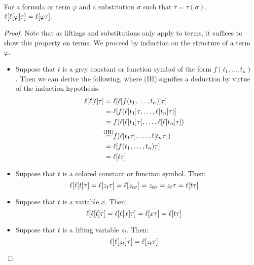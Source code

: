 %
%
\begin{lemma}
	\label{lemma:lifting_tau_commute}
	For a formula or term $\varphi$ and a substitution $\sigma$ such that $\tau = \tau(\sigma)$,
	$\lifboth{\lifboth{ \varphi} \tau} =\nolinebreak \lifboth{ \varphi \tau } $.
\end{lemma}
\begin{proof}
	Note that as liftings and substitutions only apply to terms, it suffices to show this property on terms.
	We proceed by induction on the structure of a term $\varphi$.

	\begin{itemize}
		\item Suppose that $t$ is a grey constant or function symbol of the form $f(t_1, \dots, t_n)$.
			Then we can derive the following, where (IH) signifies a deduction by virtue of the induction hypothesis. 
			\begin{align*}
				\lifboth{\lifboth{t}\tau} &= \lifboth{\lifboth{ f(t_1, \dots, t_n)}\tau} \\
																													&= \lifboth{ f(\lifboth{t_1}\tau, \dots, \lifboth{t_n}\tau) } \\
																											&= f(\lifboth{\lifboth{t_1}\tau}, \dots, \lifboth{\lifboth{t_n}\tau}) \\
																									&\stackrel{\mathclap{\text{(IH)}}}= f(\lifboth{t_1\tau}, \dots, \lifboth{t_n\tau}) \\
																							&= \lifboth{f(t_1, \dots, t_n)\tau} \\
																					 &= \lifboth{t\tau}
			\end{align*}
		\item Suppose that $t$ is a colored constant or function symbol. Then:
			\[
				\ell[\ell[t]\tau]= \ell[z_t\tau] 
				= \ell[z_{t\sigma}] 
				= z_{t\sigma} 
				= z_t\tau
				= \ell[t\tau]
			\]
		\item Suppose that $t$ is a variable $x$. Then:
			\[
				\ell[\ell[t]\tau] = \ell[\ell[ x]\tau] = \ell[x\tau] = \ell[t\tau]
			\]
		\item Suppose that $t$ is a lifting variable $z_t$. Then:
			\[
				\ell[\ell[z_t]\tau] = \ell[z_t\tau] 
				\qedhere
			\]
	\end{itemize}

\end{proof}


